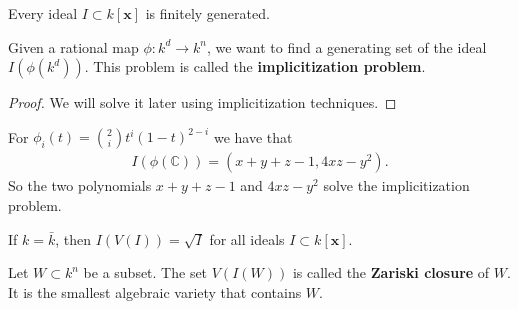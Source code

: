 \begin{thm}
  Every ideal \( I \subset k[\mathbf x] \) is finitely generated. 
\end{thm}

\begin{remark}
  Given a rational map \( \phi: k^d \to k^n \), we want to find a generating set of the ideal \( I(\phi(k^d)) \). This problem is called the \textbf{implicitization problem}.
\end{remark}



\begin{proof}
  We will solve it later using implicitization techniques.
\end{proof}

\begin{eg}
  For \( \phi_i(t) = {2 \choose i} t^{i}(1 - t)^{2 - i} \) we have that 
  \begin{align*}
    I(\phi(\mathbb C)) = (x + y + z  - 1, 4xz - y^2).
  \end{align*}
  So the two polynomials \( x + y + z - 1 \) and \( 4xz - y^2 \) solve the implicitization problem.
\end{eg}

\begin{thm}[Nullstellensatz]
  If \( k = \bar k \), then \( I(V(I)) = \sqrt I \) for all ideals \( I \subset k[\mathbf x] \).
\end{thm}

\begin{defi}
  Let \( W \subset k^n \) be a subset. The set \( V(I(W)) \) is called the \textbf{Zariski closure} of \( W \). It is the smallest algebraic variety that contains \( W \).
\end{defi}


